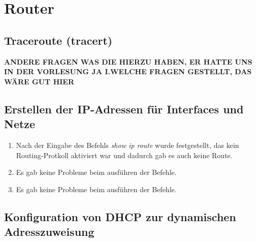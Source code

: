 \documentclass{scrartcl}
\begin{document}
  \newpage
\section[Versuch 5 Router]{Router}
  
  \subsection[Aufgabe 2 Traceroute (tracert)]{Traceroute (tracert)}
  \textbf{ANDERE FRAGEN WAS DIE HIERZU HABEN, ER HATTE UNS IN DER VORLESUNG JA I.WELCHE FRAGEN GESTELLT, DAS WÄRE GUT HIER}
  
  \subsection[Aufgabe 4 Erstellen der IP-Adressen für Interfaces und Netze]{Erstellen der IP-Adressen für Interfaces und Netze}
  
  \renewcommand{\labelenumi}{\alph{enumi})}
  \begin{enumerate}
  \item
  Nach der Eingabe des Befehls \textit{show ip route} wurde festgestellt, das kein Routing-Protkoll aktiviert war und dadurch gab es auch keine Route.
  
  \item
  Es gab keine Probleme beim ausführen der Befehle.
  
  \item
  Es gab keine Probleme beim ausführen der Befehle.
  \end{enumerate}
  
  \subsection[Aufgabe 5 Konfiguration von DHCP zur dynamischen Adresszuweisung]{Konfiguration von DHCP zur dynamischen Adresszuweisung}
  
\end{document}
